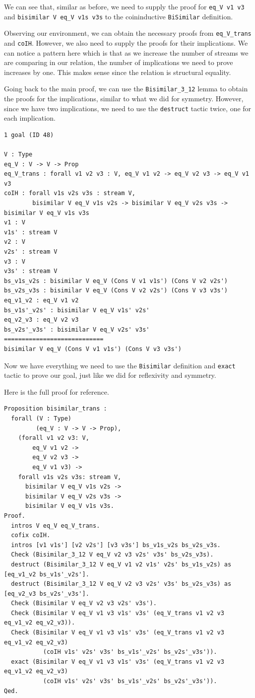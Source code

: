 \documentclass{article}
\begin{document}
We can see that, similar as before, we need to supply the proof for \texttt{eq\_V v1 v3} and \texttt{bisimilar V eq\_V v1s v3s} to the coininductive \texttt{BiSimilar} definition. 

Observing our environment, we can obtain the necessary proofs from \texttt{eq\_V\_trans} and \texttt{coIH}. However, we also need to supply the proofs for their implications. We can notice a pattern here which is that as we increase the number of streams we are comparing in our relation, the number of implications we need to prove increases by one. This makes sense since the relation is structural equality. 

Going back to the main proof, we can use the \texttt{Bisimilar\_3\_12} lemma to obtain the proofs for the implications, similar to what we did for symmetry. However, since we have two implications, we need to use the \texttt{destruct} tactic twice, one for each implication.

\begin{lstlisting}
1 goal (ID 48)

V : Type
eq_V : V -> V -> Prop
eq_V_trans : forall v1 v2 v3 : V, eq_V v1 v2 -> eq_V v2 v3 -> eq_V v1 v3
coIH : forall v1s v2s v3s : stream V,
        bisimilar V eq_V v1s v2s -> bisimilar V eq_V v2s v3s -> bisimilar V eq_V v1s v3s
v1 : V
v1s' : stream V
v2 : V
v2s' : stream V
v3 : V
v3s' : stream V
bs_v1s_v2s : bisimilar V eq_V (Cons V v1 v1s') (Cons V v2 v2s')
bs_v2s_v3s : bisimilar V eq_V (Cons V v2 v2s') (Cons V v3 v3s')
eq_v1_v2 : eq_V v1 v2
bs_v1s'_v2s' : bisimilar V eq_V v1s' v2s'
eq_v2_v3 : eq_V v2 v3
bs_v2s'_v3s' : bisimilar V eq_V v2s' v3s'
============================
bisimilar V eq_V (Cons V v1 v1s') (Cons V v3 v3s')
\end{lstlisting}

Now we have everything we need to use the \texttt{Bisimilar} definition and \texttt{exact} tactic to prove our goal, just like we did for reflexivity and symmetry.

Here is the full proof for reference.

\begin{lstlisting}
Proposition bisimilar_trans :
  forall (V : Type)
         (eq_V : V -> V -> Prop),
    (forall v1 v2 v3: V,
        eq_V v1 v2 ->
        eq_V v2 v3 ->
        eq_V v1 v3) ->
    forall v1s v2s v3s: stream V,
      bisimilar V eq_V v1s v2s ->
      bisimilar V eq_V v2s v3s ->
      bisimilar V eq_V v1s v3s.
Proof.
  intros V eq_V eq_V_trans.
  cofix coIH.
  intros [v1 v1s'] [v2 v2s'] [v3 v3s'] bs_v1s_v2s bs_v2s_v3s.
  Check (Bisimilar_3_12 V eq_V v2 v3 v2s' v3s' bs_v2s_v3s).
  destruct (Bisimilar_3_12 V eq_V v1 v2 v1s' v2s' bs_v1s_v2s) as [eq_v1_v2 bs_v1s'_v2s'].
  destruct (Bisimilar_3_12 V eq_V v2 v3 v2s' v3s' bs_v2s_v3s) as [eq_v2_v3 bs_v2s'_v3s'].
  Check (Bisimilar V eq_V v2 v3 v2s' v3s').
  Check (Bisimilar V eq_V v1 v3 v1s' v3s' (eq_V_trans v1 v2 v3 eq_v1_v2 eq_v2_v3)).
  Check (Bisimilar V eq_V v1 v3 v1s' v3s' (eq_V_trans v1 v2 v3 eq_v1_v2 eq_v2_v3)
           (coIH v1s' v2s' v3s' bs_v1s'_v2s' bs_v2s'_v3s')).
  exact (Bisimilar V eq_V v1 v3 v1s' v3s' (eq_V_trans v1 v2 v3 eq_v1_v2 eq_v2_v3)
           (coIH v1s' v2s' v3s' bs_v1s'_v2s' bs_v2s'_v3s')).
Qed.
\end{lstlisting}
\end{document}
